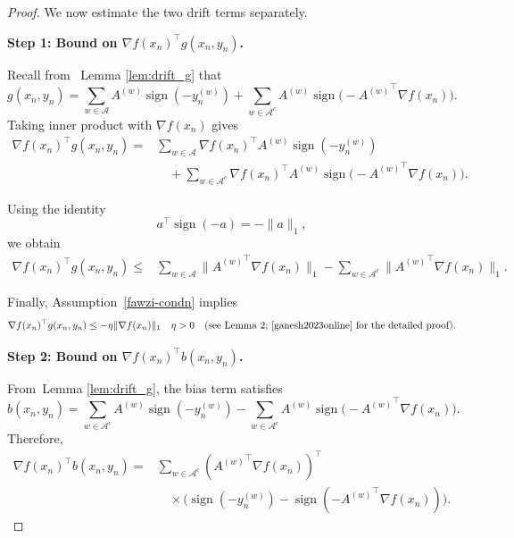 \documentclass{article}
\DeclareMathOperator*{\sign}{sign}
\begin{document}
\begin{proof}
We now estimate the two drift terms separately.

\medskip

\noindent
\textbf{Step 1: Bound on $\nabla f(x_n)^\top g(x_n,y_n)$.}

Recall from~ Lemma \ref{lem:drift_g} that
\[
    g(x_n,y_n)
    =
    \sum_{w \in \mathcal{A}}
    A^{(w)} \sign(-y_n^{(w)})
    +
    \sum_{w \in \mathcal{A}^c}
    A^{(w)}
    \sign\!\big(-{A^{(w)}}^\top \nabla f(x_n)\big).
\]
Taking inner product with $\nabla f(x_n)$ gives
\begin{equation*}
\begin{split}
    \nabla f(x_n)^\top g(x_n,y_n)
    ={}&
    \sum_{w \in \mathcal{A}}
    \nabla f(x_n)^\top
    A^{(w)}
    \sign(-y_n^{(w)})
    \\
    &\quad
    +
    \sum_{w \in \mathcal{A}^c}
    \nabla f(x_n)^\top
    A^{(w)}
    \sign\!\big(-{A^{(w)}}^\top \nabla f(x_n)\big).
\end{split}
\end{equation*}

Using the identity
\[
a^\top \sign(-a) = -\|a\|_1,
\]
we obtain
\[
\begin{aligned}
    \nabla f(x_n)^\top g(x_n,y_n)
    \le{}&
    \sum_{w \in \mathcal{A}}
    \|{A^{(w)}}^\top \nabla f(x_n)\|_1
    -
    \sum_{w \in \mathcal{A}^c}
    \|{A^{(w)}}^\top \nabla f(x_n)\|_1 .
\end{aligned}
\]

Finally, Assumption~\ref{fawzi-condn} implies
\[
    \nabla f(x_n)^\top g(x_n,y_n)
    \le
    -\eta \|\nabla f(x_n)\|_1 \quad \eta > 0 \quad \text{(see Lemma 2; \cite{ganesh2023online} for the detailed proof)} .
\]

\medskip

\noindent
\textbf{Step 2: Bound on $\nabla f(x_n)^\top b(x_n,y_n)$.}

From~Lemma \ref{lem:drift_g}, the bias term satisfies
\[
    b(x_n,y_n)
    =
    \sum_{w \in \mathcal{A}^c}
    A^{(w)} \sign(-y_n^{(w)})
    -
    \sum_{w \in \mathcal{A}^c}
    A^{(w)}
    \sign\!\big(-{A^{(w)}}^\top \nabla f(x_n)\big).
\]
Therefore,
\begin{equation*}
\begin{split}
    \nabla f(x_n)^\top b(x_n,y_n)
    ={}&
    \sum_{w \in \mathcal{A}^c}
    ({A^{(w)}}^\top \nabla f(x_n))^\top
    \\
    &\quad \times
    \Big(
    \sign(-y_n^{(w)})
    -
    \sign(-{A^{(w)}}^\top \nabla f(x_n))
    \Big).
\end{split}
\end{equation*}


\end{proof}
\end{document}
